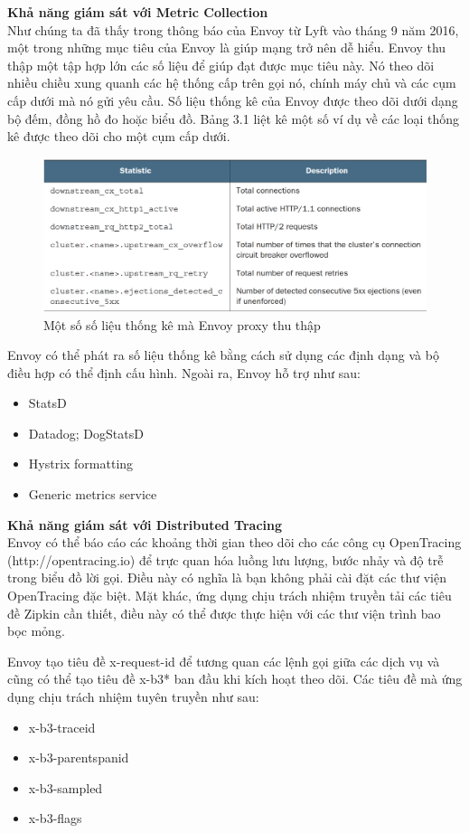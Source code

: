\documentclass[12pt,a4paper]{report}
\begin{document}
		\textbf{Khả năng giám sát với Metric Collection}\\
		Như chúng ta đã thấy trong thông báo của Envoy từ Lyft vào tháng 9 năm 2016, một trong những mục tiêu của Envoy là giúp mạng trở nên dễ hiểu. Envoy thu thập một tập hợp lớn các số liệu để giúp đạt được mục tiêu này. Nó theo dõi nhiều chiều xung quanh các hệ thống cấp trên gọi nó, chính máy chủ và các cụm cấp dưới mà nó gửi yêu cầu. Số liệu thống kê của Envoy được theo dõi dưới dạng bộ đếm, đồng hồ đo hoặc biểu đồ. Bảng 3.1 liệt kê một số ví dụ về các loại thống kê được theo dõi cho một cụm cấp dưới.
		\begin{figure}[h]
			\centering
			\includegraphics[width=0.7\linewidth]{Pics/2.1.3-p4}
			\caption{Một số số liệu thống kê mà Envoy proxy thu thập}
			\label{fig:2.3.1-4}
		\end{figure}
		
		Envoy có thể phát ra số liệu thống kê bằng cách sử dụng các định dạng và bộ điều hợp có thể định cấu hình. Ngoài ra, Envoy hỗ trợ như sau:
		\begin{itemize}
			\item StatsD
			\item Datadog; DogStatsD
			\item Hystrix formatting
			\item Generic metrics service
		\end{itemize}
		
		\textbf{Khả năng giám sát với Distributed Tracing}\\
		Envoy có thể báo cáo các khoảng thời gian theo dõi cho các công cụ OpenTracing (http://opentracing.io) để trực quan hóa luồng lưu lượng, bước nhảy và độ trễ trong biểu đồ lời gọi. Điều này có nghĩa là bạn không phải cài đặt các thư viện OpenTracing đặc biệt. Mặt khác, ứng dụng chịu trách nhiệm truyền tải các tiêu đề Zipkin cần thiết, điều này có thể được thực hiện với các thư viện trình bao bọc mỏng.
		
		Envoy tạo tiêu đề x-request-id để tương quan các lệnh gọi giữa các dịch vụ và cũng có thể tạo tiêu đề x-b3* ban đầu khi kích hoạt theo dõi. Các tiêu đề mà ứng dụng chịu trách nhiệm tuyên truyền như sau:
		\begin{itemize}
			\item x-b3-traceid
			\item x-b3-parentspanid
			\item x-b3-sampled
			\item x-b3-flags
		\end{itemize}
		
\end{document}
